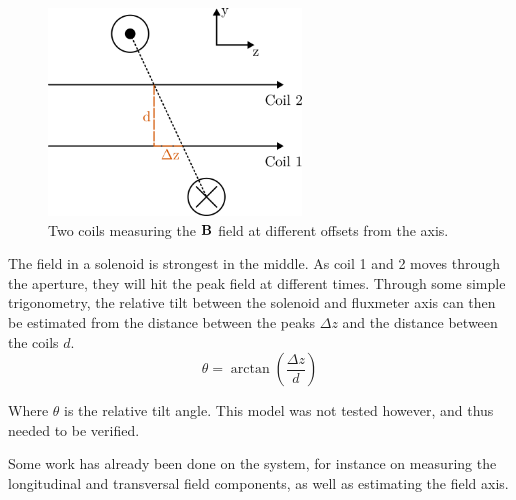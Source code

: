 \begin{figure}[!h]
    \centering
    \includegraphics[width=0.6\textwidth]{figs/coil-dz}
    \caption{Two coils measuring the $\vb{B}$ field at different offsets
        from the axis.}
    \label{fig:coil-dz}
\end{figure}

The field in a solenoid is strongest in the middle. As coil 1
and 2 moves through the aperture, they will hit the peak field at different
times. Through some simple trigonometry, the relative tilt between the
solenoid and fluxmeter axis can then be estimated from the distance between
the peaks $\Delta z$ and the distance between the coils $d$.
\begin{equation}
    \theta = \arctan \left( \frac{\Delta z}{d} \right)
    \label{eq:angle_estimation}
\end{equation}

Where $\theta$ is the relative tilt angle.
This model was not tested however, and thus needed to be verified.


Some work has already been done on the system, for instance on measuring
the longitudinal and transversal field components, as well as estimating
the field axis. \cite{petrone_induction-coil_2022}